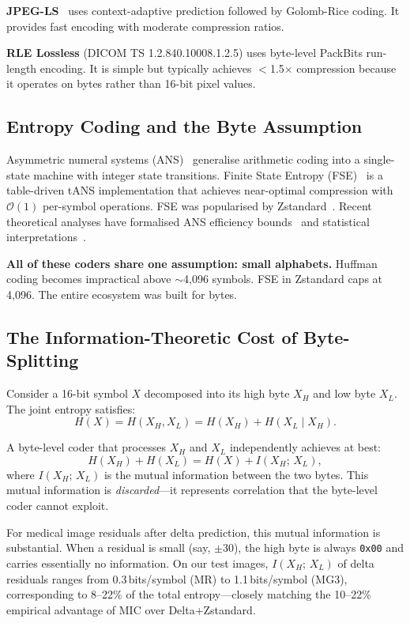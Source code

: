 \documentclass[10pt,twocolumn]{article}
\begin{document}
\textbf{JPEG-LS}~\cite{loco1} uses context-adaptive prediction followed by
Golomb-Rice coding. It provides fast encoding with moderate compression ratios.

\textbf{RLE Lossless} (DICOM TS 1.2.840.10008.1.2.5) uses byte-level PackBits
run-length encoding. It is simple but typically achieves $<$1.5$\times$
compression because it operates on bytes rather than 16-bit pixel values.

\subsection{Entropy Coding and the Byte Assumption}

Asymmetric numeral systems (ANS)~\cite{duda2009,duda2013} generalise arithmetic
coding into a single-state machine with integer state transitions. Finite State
Entropy (FSE)~\cite{fse} is a table-driven tANS implementation that achieves
near-optimal compression with $\mathcal{O}(1)$ per-symbol operations. FSE was
popularised by Zstandard~\cite{rfc8878}. Recent theoretical analyses have
formalised ANS efficiency bounds~\cite{kosolobov2022} and statistical
interpretations~\cite{bamler2022}.

\textbf{All of these coders share one assumption: small alphabets.} Huffman
coding becomes impractical above $\sim$4,096 symbols. FSE in Zstandard caps at
4,096. The entire ecosystem was built for bytes.

\subsection{The Information-Theoretic Cost of Byte-Splitting}

Consider a 16-bit symbol $X$ decomposed into its high byte $X_H$ and low byte
$X_L$. The joint entropy satisfies:
\begin{equation}
  H(X) = H(X_H, X_L) = H(X_H) + H(X_L \mid X_H).
\end{equation}

A byte-level coder that processes $X_H$ and $X_L$ independently achieves at
best:
\begin{equation}
  H(X_H) + H(X_L) = H(X) + I(X_H;\, X_L),
\end{equation}
where $I(X_H;\, X_L)$ is the mutual information between the two bytes. This
mutual information is \emph{discarded}---it represents correlation that the
byte-level coder cannot exploit.

For medical image residuals after delta prediction, this mutual information is
substantial. When a residual is small (say, $\pm 30$), the high byte is always
\texttt{0x00} and carries essentially no information. On our test images,
$I(X_H;\, X_L)$ of delta residuals ranges from 0.3\,bits/symbol (MR) to
1.1\,bits/symbol (MG3), corresponding to 8--22\% of the total entropy---closely
matching the 10--22\% empirical advantage of MIC over Delta+Zstandard.
\end{document}
